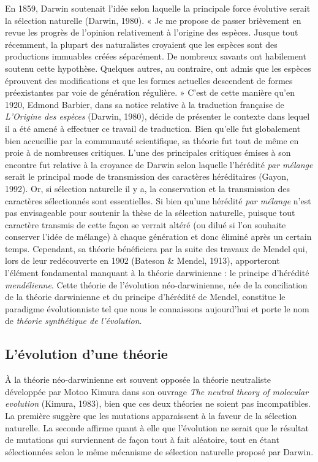 \documentclass[12pt,a4paper,twoside]{ugathesis}
\theoremstyle{definition}
\theoremstyle{definition}
\theoremstyle{remark}
\begin{document}
En 1859, Darwin soutenait l'idée selon laquelle la principale force
évolutive serait la sélection naturelle (Darwin, 1980). « Je me propose
de passer brièvement en revue les progrès de l'opinion relativement à
l'origine des espèces. Jusque tout récemment, la plupart des
naturalistes croyaient que les espèces sont des productions immuables
créées séparément. De nombreux savants ont habilement soutenu cette
hypothèse. Quelques autres, au contraire, ont admis que les espèces
éprouvent des modifications et que les formes actuelles descendent de
formes préexistantes par voie de génération régulière. » C'est de cette
manière qu'en 1920, Edmond Barbier, dans sa notice relative à la
traduction française de \emph{L'Origine des espèces} (Darwin, 1980),
décide de présenter le contexte dans lequel il a été amené à effectuer
ce travail de traduction. Bien qu'elle fut globalement bien accueillie
par la communauté scientifique, sa théorie fut tout de même en proie à
de nombreuses critiques. L'une des principales critiques émises à son
encontre fut relative à la croyance de Darwin selon laquelle l'hérédité
\emph{par mélange} serait le principal mode de transmission des
caractères héréditaires (Gayon, 1992). Or, si sélection naturelle il y
a, la conservation et la transmission des caractères sélectionnés sont
essentielles. Si bien qu'une hérédité \emph{par mélange} n'est pas
envisageable pour soutenir la thèse de la sélection naturelle, puisque
tout caractère transmis de cette façon se verrait altéré (ou dilué si
l'on souhaite conserver l'idée de mélange) à chaque génération et donc
éliminé après un certain temps. Cependant, sa théorie bénéficiera par la
suite des travaux de Mendel qui, lors de leur redécouverte en 1902
(Bateson \& Mendel, 1913), apporteront l'élément fondamental manquant à
la théorie darwinienne : le principe d'hérédité \emph{mendélienne}.
Cette théorie de l'évolution néo-darwinienne, née de la conciliation de
la théorie darwinienne et du principe d'hérédité de Mendel, constitue le
paradigme évolutionniste tel que nous le connaissons aujourd'hui et
porte le nom de \emph{théorie synthétique de l'évolution}.

\subsection{L'évolution d'une théorie}\label{levolution-dune-theorie}

À la théorie néo-darwinienne est souvent opposée la théorie neutraliste
développée par Motoo Kimura dans son ouvrage \emph{The neutral theory of
molecular evolution} (Kimura, 1983), bien que ces deux théories ne
soient pas incompatibles. La première suggère que les mutations
apparaissent à la faveur de la sélection naturelle. La seconde affirme
quant à elle que l'évolution ne serait que le résultat de mutations qui
surviennent de façon tout à fait aléatoire, tout en étant sélectionnées
selon le même mécanisme de sélection naturelle proposé par Darwin.
\end{document}

